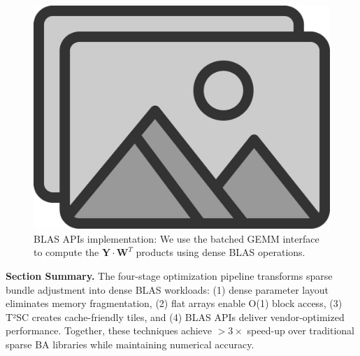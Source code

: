 \begin{figure}[t]
  \centering
  \includegraphics[width=0.75\linewidth]{figs/placeholder}
  \caption{BLAS APIs implementation: We use the batched GEMM interface to compute the 
  $\mathbf{Y} \cdot \mathbf{W}^T$ products using dense BLAS operations.}
  \label{fig:blas_apis}
\end{figure}

\textbf{Section Summary.} The four-stage optimization pipeline transforms sparse bundle adjustment 
into dense BLAS workloads: (1) dense parameter layout eliminates memory fragmentation, 
(2) flat arrays enable O(1) block access, (3) T²SC creates cache-friendly tiles, and 
(4) BLAS APIs deliver vendor-optimized performance. Together, these techniques achieve 
$>3\times$ speed-up over traditional sparse BA libraries while maintaining numerical accuracy.

